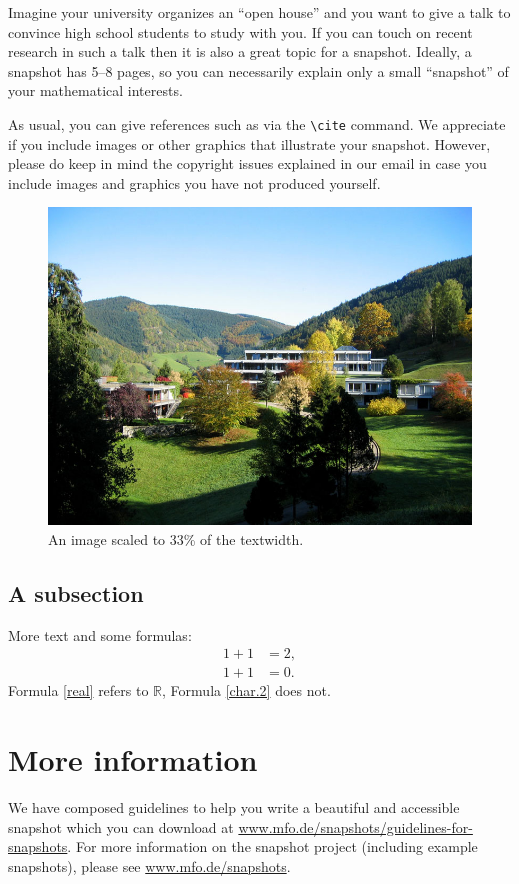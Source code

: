 \documentclass{snapshotmfo}
\begin{document}
Imagine your university organizes an ``open house'' and you want to give a talk to convince high school students to study with you. If you can touch on recent research in such a talk then it is also a great topic for a snapshot. Ideally, a snapshot has 5--8 pages, so you can necessarily explain only a small ``snapshot'' of your mathematical interests.

As usual, you can give references such as \cite{knuth1984texbook, wikiMath, sample13, sample12, sample11, sample14, helfgott14} via the \verb+\cite+ command.
We appreciate if you include images or other graphics that illustrate your snapshot. However, please do keep in mind the copyright issues explained in our email in case you include images and graphics you have not produced yourself.

\begin{figure}[ht]
        \centering
        \includegraphics[width= 0.33 \textwidth]{mfo.jpg}
        \caption{An image scaled to 33\% of the textwidth.}
\label{fig.sample-image}
\end{figure}

\subsection{A subsection}
More text and some formulas:
\begin{align}\label{real}
1+1&=2,\\\label{char.2}
1+1&=0.
\end{align}
Formula \eqref{real} refers to $\mathbb{R}$, Formula \eqref{char.2} does not.

\section{More information}
We have composed guidelines to help you write a beautiful and accessible snapshot which you can download at \href{https://www.mfo.de/snapshots/guidelines-for-snapshots}{www.mfo.de/snapshots/guidelines-for-snapshots}. For more information on the snapshot project (including example snapshots), please see \href{https://www.mfo.de/snapshots}{www.mfo.de/snapshots}.
\end{document}
